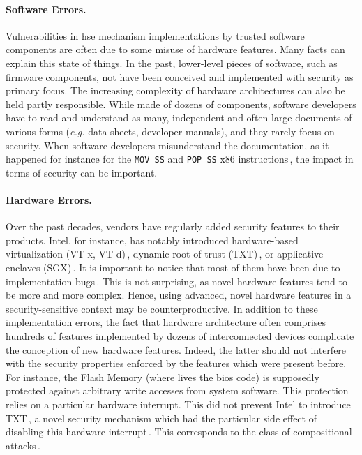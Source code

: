 \paragraph{Software Errors.}
%
Vulnerabilities in \ac{hse} mechanism implementations by trusted software
components are often due to some misuse of hardware features.
%
Many facts can explain this state of things.
%
In the past,  lower-level pieces of software, such as firmware components,
not have been conceived and implemented with security as primary focus.
%
The increasing complexity of hardware architectures can also be held partly
responsible.
%
While  made of dozens of components, software developers have
to read and understand as many, independent and often large documents of various
forms (\emph{e.g.} data sheets, developer manuals), and they rarely focus on
security.
%
When software developers misunderstand the documentation, as it happened for
instance for the \texttt{MOV SS} and \texttt{POP SS} x86
instructions\,\cite{movsspopss}, the impact in terms of security can be
important.

\paragraph{Hardware Errors.}
%
Over the past decades, vendors have regularly added security features to their
products.
%
Intel, for instance, has notably introduced hardware-based virtualization (VT-x,
VT-d)\,\cite{intel2014manualvt}, dynamic root of trust
(TXT)\,\cite{intel2015txt}, or applicative enclaves
(SGX)\,\cite{intel2014manualsgx,costan2016sgxexplained}.
%
It is important to notice that most of them have been
 due to
implementation bugs\,\cite{wojtczuk2011txtbug,sang2010iommu}.
%
This is not surprising, as novel hardware features tend to be more and more
complex.
%
Hence, using advanced, novel hardware features in a security-sensitive context
may be counterproductive.
%
In addition to these implementation errors, the fact that hardware architecture
often comprises hundreds of features implemented by dozens of interconnected
devices complicate the conception of new hardware features.
%
Indeed, the latter should not interfere with the security properties enforced by
the features which were present before.
%
For instance, the Flash Memory (where lives the \ac{bios} code) is supposedly
protected against arbitrary write accesses from system software.
%
This protection relies on a particular hardware interrupt.
%
This did not prevent Intel to introduce TXT\,\cite{intel2015txt}, a novel
security mechanism which had the particular side effect of disabling this
hardware interrupt\,\cite{kovah2015senter}.
%
This corresponds to the class of compositional
attacks\,\cite{wing2003compositionalattack}.

